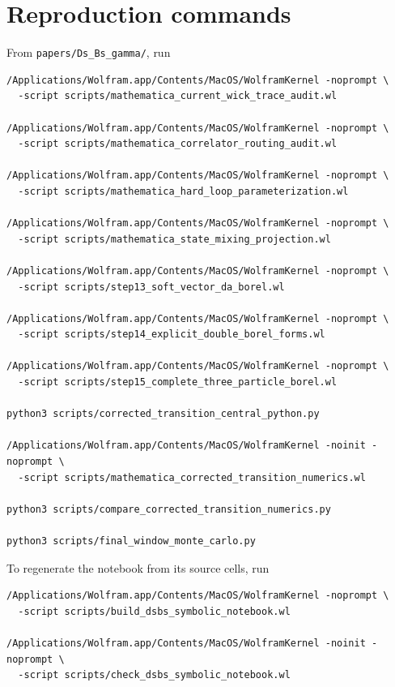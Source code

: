 \documentclass[11pt]{article}
\begin{document}
\appendix
\section{Reproduction commands}

From \texttt{papers/Ds\_Bs\_gamma/}, run
\begin{lstlisting}[language={},basicstyle=\ttfamily\scriptsize]
/Applications/Wolfram.app/Contents/MacOS/WolframKernel -noprompt \
  -script scripts/mathematica_current_wick_trace_audit.wl

/Applications/Wolfram.app/Contents/MacOS/WolframKernel -noprompt \
  -script scripts/mathematica_correlator_routing_audit.wl

/Applications/Wolfram.app/Contents/MacOS/WolframKernel -noprompt \
  -script scripts/mathematica_hard_loop_parameterization.wl

/Applications/Wolfram.app/Contents/MacOS/WolframKernel -noprompt \
  -script scripts/mathematica_state_mixing_projection.wl

/Applications/Wolfram.app/Contents/MacOS/WolframKernel -noprompt \
  -script scripts/step13_soft_vector_da_borel.wl

/Applications/Wolfram.app/Contents/MacOS/WolframKernel -noprompt \
  -script scripts/step14_explicit_double_borel_forms.wl

/Applications/Wolfram.app/Contents/MacOS/WolframKernel -noprompt \
  -script scripts/step15_complete_three_particle_borel.wl

python3 scripts/corrected_transition_central_python.py

/Applications/Wolfram.app/Contents/MacOS/WolframKernel -noinit -noprompt \
  -script scripts/mathematica_corrected_transition_numerics.wl

python3 scripts/compare_corrected_transition_numerics.py

python3 scripts/final_window_monte_carlo.py
\end{lstlisting}
To regenerate the notebook from its source cells, run
\begin{lstlisting}[language={},basicstyle=\ttfamily\scriptsize]
/Applications/Wolfram.app/Contents/MacOS/WolframKernel -noprompt \
  -script scripts/build_dsbs_symbolic_notebook.wl

/Applications/Wolfram.app/Contents/MacOS/WolframKernel -noinit -noprompt \
  -script scripts/check_dsbs_symbolic_notebook.wl
\end{lstlisting}
\end{document}
